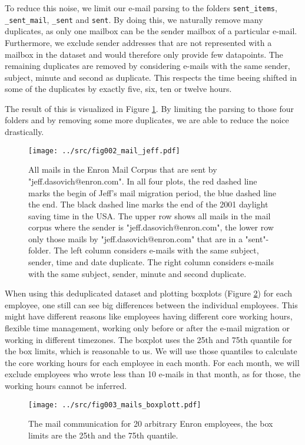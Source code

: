 \documentclass{article}
\begin{document}
To reduce this noise, we limit our e-mail parsing to the folders
\texttt{sent\_items}, \texttt{\_sent\_mail}, \texttt{\_sent} and \texttt{sent}.
By doing this, we naturally remove many duplicates, as only one mailbox can be
the sender mailbox of a particular e-mail. Furthermore, we exclude sender
addresses that are not represented with a mailbox in the dataset and would
therefore only provide few datapoints. The remaining duplicates are removed by
considering e-mails with the same sender, subject, minute and second as
duplicate. This respects the time beeing shifted in some of the duplicates by
exactly five, six, ten or twelve hours.

The result of this is visualized in Figure \ref{fig:jeffmail}. By limiting the
parsing to those four folders and by removing some more duplicates, we are able
to reduce the noice drastically.

\begin{figure}
  \centering
  \texttt{[image: ../src/fig002\_mail\_jeff.pdf]}
  \label{fig:jeffmail}
  \caption{All mails in the Enron Mail Corpus that are sent by
  "jeff.dasovich@enron.com". In all four plots, the red dashed line marks the
  begin of Jeff's mail migration period, the blue dashed line the end. The black
  dashed line marks the end of the 2001 daylight saving time in the USA. The
  upper row shows all mails in the mail corpus where the sender is
  "jeff.dasovich@enron.com", the lower row only those mails by
  "jeff.dasovich@enron.com" that are in a "sent"-folder. The left column
  considers e-mails with the same subject, sender, time and date duplicate. The
  right column considers e-mails with the same subject, sender, minute and
  second duplicate. }
\end{figure}

When using this deduplicated dataset and plotting boxplots (Figure
\ref{fig:mailboxplot}) for each employee, one still can see big differences
between the individual employees. This might have different reasons like
employees having different core working hours, flexible time management, working
only before or after the e-mail migration or working in different timezones. The
boxplot uses the 25th and 75th quantile for the box limits, which is reasonable
to us. We will use those quantiles to calculate the core working hours for each
employee in each month. For each month, we will exclude employees who wrote less
than 10 e-mails in that month, as for those, the working hours cannot be
inferred. 

\begin{figure}
  \centering
  \texttt{[image: ../src/fig003\_mails\_boxplott.pdf]}
   \caption{The mail communication for 20 arbitrary Enron employees, the box 
   limits are the 25th and the 75th quantile.}
  \label{fig:mailboxplot}
\end{figure}
\end{document}
